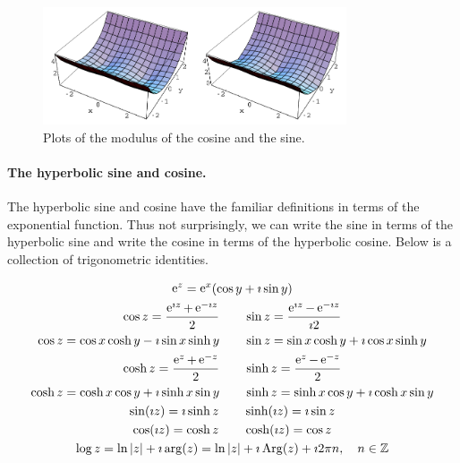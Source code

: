 \begin{figure}[htbp!]
  \begin{center}
    \includegraphics[width=0.8\textwidth]{fcv/function/cosmsinm}
  \end{center}
  \caption{Plots of the modulus of the cosine and the sine.}
  \label{cosmsinm}
\end{figure}



\paragraph{The hyperbolic sine and cosine.}
The hyperbolic sine and cosine have the familiar definitions in terms of the 
exponential function.  Thus not surprisingly, we can write the sine
in terms of the hyperbolic sine and write the cosine in terms of the
hyperbolic cosine.  Below is a collection of trigonometric identities.




\begin{Result}
  \begin{gather*}
    \mathop{\mathrm{e}}\nolimits^z = \mathop{\mathrm{e}}\nolimits^x (\cos y + \imath \sin y) 
    \\
    \cos z = \frac{\mathop{\mathrm{e}}\nolimits^{\imath z} + \mathop{\mathrm{e}}\nolimits^{-\imath z}}{2} 
    \qquad 
    \sin z = \frac{\mathop{\mathrm{e}}\nolimits^{\imath z} - \mathop{\mathrm{e}}\nolimits^{-\imath z}}{\imath 2} 
    \\
    \cos z = \cos x \cosh y - \imath \sin x \sinh y 
    \qquad
    \sin z = \sin x \cosh y + \imath \cos x \sinh y 
    \\
    \cosh z = \frac{\mathop{\mathrm{e}}\nolimits^z + \mathop{\mathrm{e}}\nolimits^{-z}}{2} 
    \qquad
    \sinh z = \frac{\mathop{\mathrm{e}}\nolimits^z - \mathop{\mathrm{e}}\nolimits^{-z}}{2} 
    \\
    \cosh z = \cosh x \cos y + \imath \sinh x \sin y 
    \qquad
    \sinh z = \sinh x \cos y + \imath \cosh x \sin y 
    \\
    \sin(\imath z) = \imath \sinh z  \qquad \sinh(\imath z) = \imath \sin z 
    \\
    \cos(\imath z) = \cosh z    \qquad \cosh(\imath z) = \cos z 
    \\
    \log z = \ln |z| + \imath \arg(z) 
    = \ln |z| + \imath \mathop{\mathrm{Arg}}\nolimits(z) + \imath 2 \pi n, \quad n \in \mathbb{Z}
  \end{gather*}
\end{Result}





















